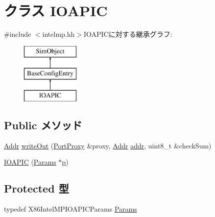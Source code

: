 \hypertarget{classX86ISA_1_1IntelMP_1_1IOAPIC}{
\section{クラス IOAPIC}
\label{classX86ISA_1_1IntelMP_1_1IOAPIC}
}


{\ttfamily \#include $<$intelmp.hh$>$}IOAPICに対する継承グラフ:\begin{figure}[H]
\begin{center}
\leavevmode
\includegraphics[height=3cm]{classX86ISA_1_1IntelMP_1_1IOAPIC}
\end{center}
\end{figure}
\subsection*{Public メソッド}
\begin{DoxyCompactItemize}
\item 
\hyperlink{base_2types_8hh_af1bb03d6a4ee096394a6749f0a169232}{Addr} \hyperlink{classX86ISA_1_1IntelMP_1_1IOAPIC_a5fffc1006b1f28bd779d83ffbe213b4f}{writeOut} (\hyperlink{classPortProxy}{PortProxy} \&proxy, \hyperlink{base_2types_8hh_af1bb03d6a4ee096394a6749f0a169232}{Addr} \hyperlink{namespaceX86ISA_ab705917f60c5566f9ce56a93f798b2e2}{addr}, uint8\_\-t \&checkSum)
\item 
\hyperlink{classX86ISA_1_1IntelMP_1_1IOAPIC_a625de1acba45ea5a08893b4f1f0f4d07}{IOAPIC} (\hyperlink{classX86ISA_1_1IntelMP_1_1IOAPIC_a438b479c81decb727ac32c221cdb909f}{Params} $\ast$\hyperlink{namespaceX86ISA_af675c1d542a25b96e11164b80809a856}{p})
\end{DoxyCompactItemize}
\subsection*{Protected 型}
\begin{DoxyCompactItemize}
\item 
typedef X86IntelMPIOAPICParams \hyperlink{classX86ISA_1_1IntelMP_1_1IOAPIC_a438b479c81decb727ac32c221cdb909f}{Params}
\end{DoxyCompactItemize}
